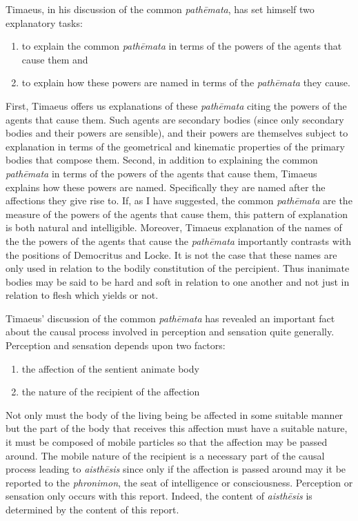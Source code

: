 Timaeus, in his discussion of the common \emph{pathēmata}, has set himself two explanatory tasks:
\begin{enumerate}
	\item to explain the common \emph{pathēmata} in terms of the powers of the agents that cause them and
	\item to explain how these powers are named in terms of the \emph{pathēmata} they cause.
\end{enumerate}
First, Timaeus offers us explanations of these \emph{pathēmata} citing the powers of the agents that cause them. Such agents are secondary bodies (since only secondary bodies and their powers are sensible), and their powers are themselves subject to explanation in terms of the geometrical and kinematic properties of the primary bodies that compose them. Second, in addition to explaining the common \emph{pathēmata} in terms of the powers of the agents that cause them, Timaeus explains how these powers are named. Specifically they are named after the affections they give rise to. If, as I have suggested, the common \emph{pathēmata} are the measure of the powers of the agents that cause them, this pattern of explanation is both natural and intelligible. Moreover, Timaeus explanation of the names of the the powers of the agents that cause the \emph{pathēmata} importantly contrasts with the positions of Democritus and Locke. It is not the case that these names are only used in relation to the bodily constitution of the percipient. Thus inanimate bodies may be said to be hard and soft in relation to one another and not just in relation to flesh which yields or not.

Timaeus' discussion of the common \emph{pathēmata} has revealed an important fact about the causal process involved in perception and sensation quite generally. Perception and sensation depends upon two factors:
\begin{enumerate}
	\item the affection of the sentient animate body
	\item the nature of the recipient of the affection
\end{enumerate}
Not only must the body of the living being be affected in some suitable manner but the part of the body that receives this affection must have a suitable nature, it must be composed of mobile particles so that the affection may be passed around. The mobile nature of the recipient is a necessary part of the causal process leading to \emph{aisthēsis} since only if the affection is passed around may it be reported to the \emph{phronimon}, the seat of intelligence or consciousness. Perception or sensation only occurs with this report. Indeed, the content of \emph{aisthēsis} is determined by the content of this report.


